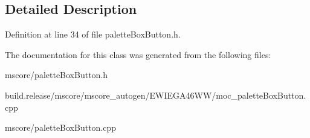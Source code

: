 \subsection{Detailed Description}


Definition at line 34 of file palette\+Box\+Button.\+h.



The documentation for this class was generated from the following files\+:\begin{DoxyCompactItemize}
\item 
mscore/palette\+Box\+Button.\+h\item 
build.\+release/mscore/mscore\+\_\+autogen/\+E\+W\+I\+E\+G\+A46\+W\+W/moc\+\_\+palette\+Box\+Button.\+cpp\item 
mscore/palette\+Box\+Button.\+cpp\end{DoxyCompactItemize}
